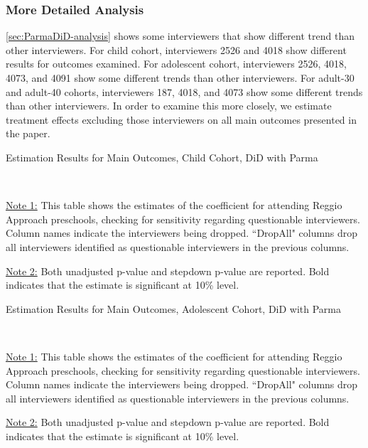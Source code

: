 \subsubsection{More Detailed Analysis}

\ref{sec:ParmaDiD-analysis} shows some interviewers that show different trend than other interviewers. For child cohort, interviewers 2526 and 4018 show different results for outcomes examined. For adolescent cohort, interviewers 2526, 4018, 4073, and 4091 show some different trends than other interviewers. For adult-30 and adult-40 cohorts, interviewers 187, 4018, and 4073 show some different trends than other interviewers.  In order to examine this more closely, we estimate treatment effects excluding those interviewers on all main outcomes presented in the paper. 




\begin{table}[H] \caption{Estimation Results for Main Outcomes, Child Cohort, DiD with Parma} \label{didpm-M-child-sensitivity}
\scalebox{0.7}{}
\vspace{1ex} \\
\footnotesize\raggedright{\underline{Note 1:} This table shows the estimates of the coefficient for attending Reggio Approach preschools, checking for sensitivity regarding questionable interviewers. Column names indicate the interviewers being dropped. ``DropAll" columns drop all interviewers identified as questionable interviewers in the previous columns.}

\footnotesize\raggedright{\underline{Note 2:} Both unadjusted p-value and stepdown p-value are reported. Bold indicates that the estimate is significant at 10\% level.}
\end{table}




\begin{table}[H] \caption{Estimation Results for Main Outcomes, Adolescent Cohort, DiD with Parma} \label{didpm-M-adol-sensitivity}
\scalebox{0.7}{}
\vspace{1ex} \\
\footnotesize\raggedright{\underline{Note 1:} This table shows the estimates of the coefficient for attending Reggio Approach preschools, checking for sensitivity regarding questionable interviewers. Column names indicate the interviewers being dropped. ``DropAll" columns drop all interviewers identified as questionable interviewers in the previous columns.}

\footnotesize\raggedright{\underline{Note 2:} Both unadjusted p-value and stepdown p-value are reported. Bold indicates that the estimate is significant at 10\% level.}
\end{table}




